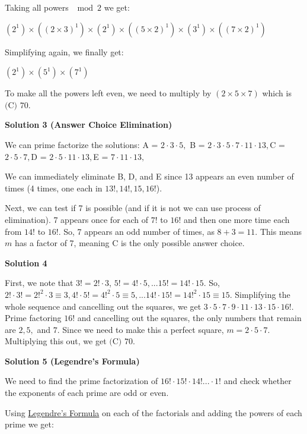 \begin{enumerate}
 Taking all powers $\mod 2$ we get:

 $(2^1) \times ((2 \times 3)^1) \times (2^1) \times ((5 \times 2)^1) \times (3^1) \times ((7 \times 2)^1)$

 Simplifying again, we finally get:

 $(2^1) \times (5^1) \times (7^1)$

 To make all the powers left even, we need to multiply by $(2 \times 5 \times 7)$ which is $\boxed{\text{(C) }   70}$.

 



\textbf{Solution 3 (Answer Choice Elimination)}

We can prime factorize the solutions: A = $2 \cdot 3 \cdot 5,$ B = $2 \cdot 3 \cdot 5 \cdot 7 \cdot 11 \cdot 13,$C = $2 \cdot 5 \cdot 7,$D = $2 \cdot 5 \cdot 11 \cdot 13,$E = $7 \cdot 11 \cdot 13,$

 We can immediately eliminate B, D, and E since 13 appears an even number of times (4 times, one each in $13!, 14!, 15, 16!$).

 Next, we can test if 7 is possible (and if it is not we can use process of elimination). 7 appears once for each of $7!$ to $16!$ and then one more time each from $14!$ to $16!$. So, 7 appears an odd number of times, as $8 + 3 = 11$. This means $m$ has a factor of 7, meaning $\boxed{\text{C}}$ is the only possible answer choice.

 



\textbf{Solution 4}

First, we note that $3! = 2! \cdot 3$, $5! = 4! \cdot 5, ... 15! = 14! \cdot 15$. So, $2!\cdot3! ={2!}^2\cdot3 \equiv 3, 4!\cdot5!={4!}^2\cdot5 \equiv 5, ... 14!\cdot15!={14!}^2\cdot15\equiv15$. Simplifying the whole sequence and cancelling out the squares, we get $3 \cdot 5 \cdot 7 \cdot 9 \cdot 11 \cdot 13 \cdot 15 \cdot 16!$. Prime factoring $16!$ and cancelling out the squares, the only numbers that remain are $2, 5,$ and $7$. Since we need to make this a perfect square, $m = 2 \cdot 5 \cdot 7$. Multiplying this out, we get $\boxed{\text{(C) }   70}$.

 



\textbf{Solution 5 (Legendre's Formula)}

We need to find the prime factorization of $16! \cdot 15! \cdot 14! ... \cdot 1!$ and check whether the exponents of each prime are odd or even. 

 Using \href{https://artofproblemsolving.com/wiki/index.php?title=Legendre\%27s\_Formula}{Legendre's Formula} on each of the factorials and adding the powers of each prime we get: 


\end{enumerate}
